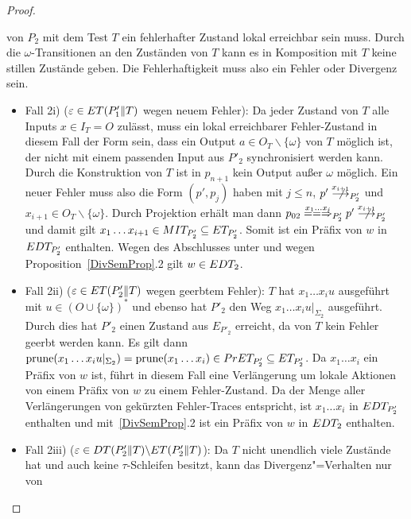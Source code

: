 \begin{proof}
\begin{itemize}
      von $P_2$ mit dem Test $T$ ein fehlerhafter Zustand lokal erreichbar sein
      muss. Durch die $\omega$-Transitionen an den Zuständen von $T$ kann es in
      Komposition mit $T$ keine stillen Zustände geben. Die Fehlerhaftigkeit
      muss also ein Fehler oder Divergenz sein.
      \begin{itemize}
        \item Fall 2i) ($\varepsilon\in ET (P'_1\|T)$ wegen neuem Fehler): Da
          jeder Zustand von $T$ alle Inputs $x\in I_T=O$ zulässt, muss ein
          lokal erreichbarer Fehler-Zustand in diesem Fall der Form sein, dass
          ein Output $a\in O_T\backslash\{\omega\}$ von $T$ möglich ist, der
          nicht mit einem passenden Input aus $P'_2$ synchronisiert werden
          kann. Durch die Konstruktion von $T$ ist in $p_{n+1}$ kein Output
          außer $\omega$ möglich. Ein neuer Fehler muss also die Form
          $(p',p_j)$ haben mit $j\leq n$, $p'\nmust[x_{i+1}]_{P'_2}$ und
          $x_{i+1}\in O_T\backslash\{\omega\}$. Durch Projektion erhält man
          dann $p_{02} \lweakmay[x_1\dots x_i]_{P'_2} p'
          \nmust[x_{i+1}]_{P'_2}$ und damit gilt $x_1\dots x_{i+1}\in MIT
          _{P'_2}\subseteq ET _{P'_2}$. Somit ist ein Präfix von $w$ in $EDT
          _{P'_2}$ enthalten. Wegen des Abschlusses unter \cont{} und wegen
          Proposition~\ref{DivSemProp}.2 gilt $w\in EDT _2$.
        \item Fall 2ii) ($\varepsilon\in ET (P'_2\|T)$ wegen geerbtem Fehler):
          $T$ hat $x_1\dots x_iu$ ausgeführt mit $u\in (O\cup\{\omega\})^*$ und
          ebenso hat $P'_2$ den Weg $x_1\dots x_iu|_{\Sigma _2}$ ausgeführt.
          Durch dies hat $P'_2$ einen Zustand aus $E_{P'_2}$ erreicht, da von
          $T$ kein Fehler geerbt werden kann. Es gilt dann $\mathrm{prune} (x_1\dots
          x_iu| _{\Sigma _2})=\mathrm{prune} (x_1\dots x_i)\in PrET _{P'_2}\subseteq
          ET _{P'_2}$. Da $x_1\dots x_i$ ein Präfix von $w$ ist, führt in
          diesem Fall eine Verlängerung um lokale Aktionen von einem Präfix von
          $w$ zu einem Fehler-Zustand. Da \ET{} der Menge aller Verlängerungen
          von gekürzten Fehler-Traces entspricht, ist $x_1\dots x_i$ in $EDT
          _{P'_2}$ enthalten und mit~\ref{DivSemProp}.2 ist ein Präfix von
          $w$ in $EDT _2$ enthalten.
        \item Fall 2iii) ($\varepsilon\in DT (P'_2\|T)\backslash ET
          (P'_2\|T)$): Da $T$ nicht unendlich viele Zustände hat und auch keine
          $\tau$-Schleifen besitzt, kann das Divergenz"=Verhalten nur von

\end{itemize}
\end{itemize}
\end{proof}
